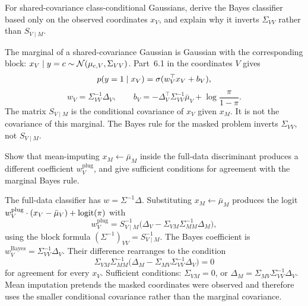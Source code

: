 \begin{hwqbox}
For shared-covariance class-conditional Gaussians, derive the Bayes classifier based only on the observed coordinates $x_V$, and explain why it inverts $\Sigma_{VV}$ rather than $S_{V\mid M}$.
\end{hwqbox}
\begin{hwsolbox}
The marginal of a shared-covariance Gaussian is Gaussian with the corresponding block: $x_V\mid y=c\sim\mathcal{N}(\mu_{c,V},\Sigma_{VV})$. Part~6.1 in the coordinates $V$ gives
\[
p(y=1\mid x_V)=\sigma(w_V^\top x_V+b_V),
\]
\[
w_V=\Sigma_{VV}^{-1}\Delta_V,\qquad
b_V=-\Delta_V^\top\Sigma_{VV}^{-1}\bar\mu_V+\log\frac{\pi}{1-\pi}.
\]
The matrix $S_{V\mid M}$ is the conditional covariance of $x_V$ given $x_M$. It is not the covariance of this marginal. The Bayes rule for the masked problem inverts $\Sigma_{VV}$, not $S_{V\mid M}$.
\end{hwsolbox}

\begin{hwqbox}
Show that mean-imputing $x_M\leftarrow\bar\mu_M$ inside the full-data discriminant produces a different coefficient $w_V^{\mathrm{plug}}$, and give sufficient conditions for agreement with the marginal Bayes rule.
\end{hwqbox}
\begin{hwsolbox}
The full-data classifier has $w=\Sigma^{-1}\Delta$. Substituting $x_M\leftarrow\bar\mu_M$ produces the logit $w_V^{\mathrm{plug}}\cdot(x_V-\bar\mu_V)+\operatorname{logit}(\pi)$ with
\[
w_V^{\mathrm{plug}}=S_{V\mid M}^{-1}\bigl(\Delta_V-\Sigma_{VM}\Sigma_{MM}^{-1}\Delta_M\bigr),
\]
using the block formula $(\Sigma^{-1})_{VV}=S_{V\mid M}^{-1}$. The Bayes coefficient is $w_V^{\mathrm{Bayes}}=\Sigma_{VV}^{-1}\Delta_V$. Their difference rearranges to the condition
\[
\Sigma_{VM}\Sigma_{MM}^{-1}\bigl(\Delta_M-\Sigma_{MV}\Sigma_{VV}^{-1}\Delta_V\bigr)=0
\]
for agreement for every $x_V$. Sufficient conditions: $\Sigma_{VM}=0$, or $\Delta_M=\Sigma_{MV}\Sigma_{VV}^{-1}\Delta_V$. Mean imputation pretends the masked coordinates were observed and therefore uses the smaller conditional covariance rather than the marginal covariance.
\end{hwsolbox}


